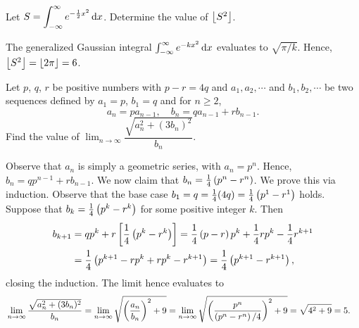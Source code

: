 \begin{question}[6]\label{A::2021-O-1-24}
    Let $S = \displaystyle\int_{-\infty}^\infty e^{-\frac12 x^2} \mathop{\mathrm{d}x}$. Determine the value of $\left\lfloor S^2 \right\rfloor$.
\end{question}
\begin{solution*}
    The generalized Gaussian integral $\int_{-\infty}^\infty e^{-k x^2} \mathop{\mathrm{d}x}$ evaluates to $\sqrt{\pi/k}$. Hence, $\left\lfloor S^2 \right\rfloor = \left\lfloor 2\pi \right\rfloor = 6$.
\end{solution*}

\begin{question}[5]\label{A::2021-O-1-25}
    Let $p$, $q$, $r$ be positive numbers with $p-r= 4q$ and $a_1, a_2, \cdots$ and $b_1, b_2, \cdots$ be two sequences defined by $a_1 = p$, $b_1 = q$ and for $n \geq 2$, \[a_n = pa_{n-1}, \quad b_n = qa_{n-1} + rb_{n-1}.\] Find the value of $\displaystyle\lim_{n \to \infty} \dfrac{\sqrt{a_n^2 + (3b_n)^2}}{b_n}$.
\end{question}
\begin{solution*}
    Observe that $a_n$ is simply a geometric series, with $a_n = p^n$. Hence, $b_n = qp^{n-1} + rb_{n-1}$. We now claim that $b_n = \frac14 \left( p^n - r^n \right)$. We prove this via induction. Observe that the base case $b_1 = q = \frac14 (4q) = \frac14 \left( p^1 - r^1 \right)$ holds. Suppose that $b_k = \frac14 \left( p^k - r^k \right)$ for some positive integer $k$. Then
    \begin{align*}
        b_{k+1} &= qp^{k} + r\left[ \frac14 \left( p^k - r^k \right) \right] = \frac14 \left( p-r \right) p^{k} + \frac14 r p^k - \frac14 r^{k+1}\\&= \frac14 \left( p^{k+1} - rp^{k} + rp^k - r^{k+1} \right) = \frac14 \left( p^{k+1} - r^{k+1} \right),
    \end{align*}
    closing the induction. The limit hence evaluates to
    \begin{align*}
        &\lim_{n \to \infty} \dfrac{\sqrt{a_n^2 + (3b_n)^2}}{b_n} = \lim_{n \to \infty} \sqrt{\left( \frac{a_n}{b_n} \right)^2 + 9} = \lim_{n \to \infty} \sqrt{\left( \frac{p^n}{\left( p^n - r^n \right)/4} \right)^2 + 9} = \sqrt{4^2 + 9} = 5.
    \end{align*}
\end{solution*}